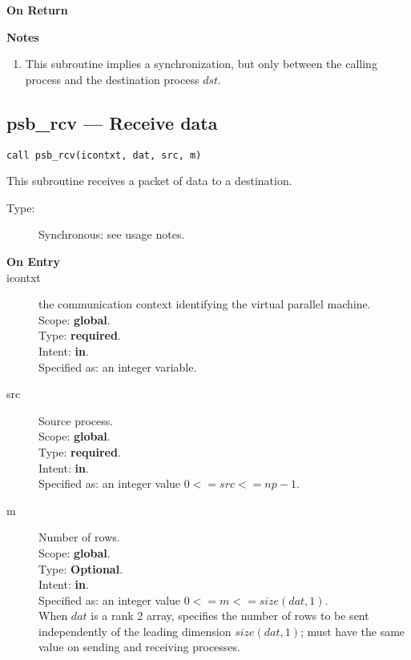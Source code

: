 \begin{description}
\item[\bf On Return]
\end{description}

{\par\noindent\large\bfseries Notes}
\begin{enumerate}
\item This subroutine implies a synchronization, but only between the
  calling process and the destination  process $dst$.
\end{enumerate}


\clearpage\subsection*{psb\_rcv --- Receive data}

\begin{verbatim}
call psb_rcv(icontxt, dat, src, m)
\end{verbatim}

This subroutine receives a packet of data to a destination.
\begin{description}
\item[Type:] Synchronous: see usage notes.
\item[\bf  On Entry ]
\item[icontxt] the communication context identifying the virtual
  parallel machine.\\
Scope: {\bf global}.\\
Type: {\bf required}.\\
Intent: {\bf in}.\\
Specified as: an integer variable.
\item[src] Source process.\\
Scope: {\bf global}.\\
Type: {\bf required}.\\
Intent: {\bf in}.\\
Specified as: an integer value $0<= src <= np-1$. \\
\item[m] Number of rows.\\
Scope: {\bf global}.\\
Type: {\bf Optional}.\\
Intent: {\bf in}.\\
Specified as: an integer value $0<= m <= size(dat,1)$. \\
When $dat$ is a rank 2 array, specifies the number of rows to be sent
independently of the leading dimension $size(dat,1)$; must have the
same value on sending and receiving processes.
\end{description}


